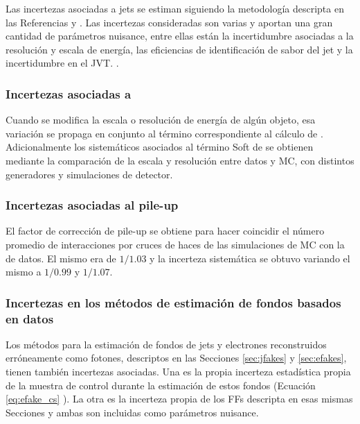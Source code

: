 Las incertezas asociadas a jets se estiman siguiendo la metodología descripta en las Referencias \cite{PERF-2011-03} y \cite{ATLAS-CONF-2015-037}. Las incertezas consideradas son varias y aportan una gran cantidad de parámetros nuisance, entre ellas están la incertidumbre asociadas a la resolución y escala de energía, las eficiencias de identificación de sabor del jet y la incertidumbre en el JVT. .

\subsubsection{Incertezas asociadas a \met}

Cuando se modifica la escala o resolución de energía de algún objeto, esa variación se propaga en conjunto al término correspondiente al cálculo de \met. Adicionalmente los sistemáticos asociados al término Soft de \met se obtienen mediante la comparación de la escala y resolución entre datos y MC, con distintos generadores y simulaciones de detector.

\subsubsection{Incertezas asociadas al pile-up}

El factor de corrección de pile-up se obtiene para hacer coincidir el número promedio de interacciones por cruces de haces de las simulaciones de MC con la de datos. El mismo era de $1/1.03$ y  la incerteza sistemática se obtuvo variando el mismo a $1/0.99$ y $1/1.07$. 

\subsubsection{Incertezas en los métodos de estimación de fondos basados en datos}

Los métodos para la estimación de fondos de jets y electrones reconstruidos erróneamente como fotones, descriptos en las Secciones \ref{sec:jfakes} y \ref{sec:efakes}, tienen también incertezas asociadas. Una es la propia incerteza estadística propia de la muestra de control durante la estimación de estos fondos (Ecuación \ref{eq:efake_cs} ). La otra es la incerteza propia de los FFs descripta en esas mismas Secciones y ambas son incluidas como parámetros nuisance.


